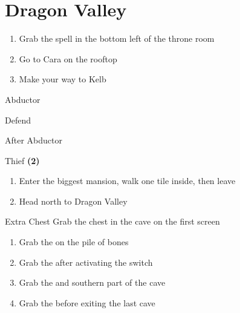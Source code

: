 \chapter{Dragon Valley}

\vspace{\baselineskip}

\begin{paracol}{2}

\begin{enumerate}
    \item Grab the  spell in the bottom left of the throne room
    \item Go to Cara on the rooftop
    \item Make your way to Kelb
\end{enumerate}

\begin{boss}{Abductor}
	\varwb
	\begin{round}{1}
		\galuf Defend
        \faris \leftCommand{\gilToss}
    \end{round}
	\varwe
\end{boss}

\begin{menu}{After Abductor}
    \varwb
    \begin{itemMenu}
        \hiPotionMenu {}
    \end{itemMenu}
    \begin{jobMenu}
        \bartz Thief \textbf{(2\pointRight)} \ability{!\escape} \optimize
    \end{jobMenu}
    \varwe
\end{menu}

\begin{enumerate}[resume]
    \item Enter the biggest mansion, walk one tile inside, then leave
    \item Head north to Dragon Valley
\end{enumerate}

\switchcolumn*
\begin{steproute}{Extra Chest}
    Grab the  chest in the cave on the first screen
\end{steproute}

\switchcolumn
\resume
\begin{enumerate}[resume]
    \item Grab the  on the pile of bones
    \item Grab the  after activating the switch
    \item Grab the  and  southern part of the cave
    \item Grab the  before exiting the last cave
\end{enumerate}


\end{paracol}
